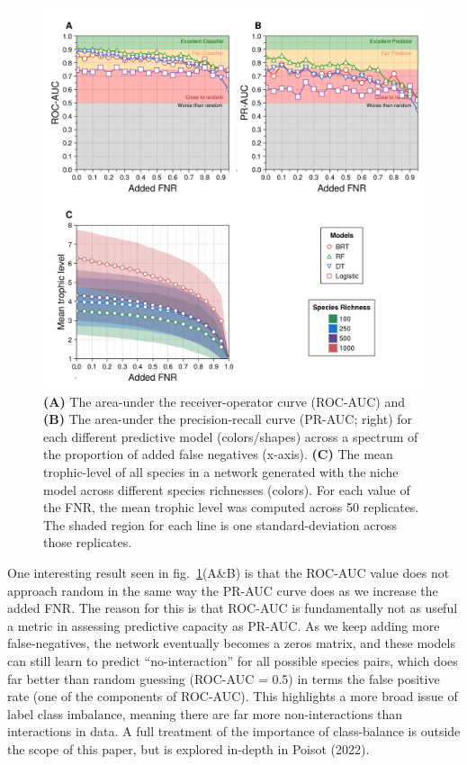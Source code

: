 \documentclass[11pt]{article}
\makeatletter
\def\maxwidth{\ifdim\Gin@nat@width>\linewidth\linewidth
\else\Gin@nat@width\fi}
\let\Oldincludegraphics\includegraphics
\renewcommand{\includegraphics}[1]{\Oldincludegraphics[width=\maxwidth]{#1}}
\makeatother
\begin{document}
\begin{figure}
\hypertarget{fig:addedfnr}{%
\centering
\includegraphics{./figures/fig3.png}
\caption{\textbf{(A)} The area-under the receiver-operator curve
(ROC-AUC) and \textbf{(B)} The area-under the precision-recall curve
(PR-AUC; right) for each different predictive model (colors/shapes)
across a spectrum of the proportion of added false negatives (x-axis).
\textbf{(C)} The mean trophic-level of all species in a network
generated with the niche model across different species richnesses
(colors). For each value of the FNR, the mean trophic level was computed
across 50 replicates. The shaded region for each line is one
standard-deviation across those replicates.}\label{fig:addedfnr}
}
\end{figure}

One interesting result seen in fig.~\ref{fig:addedfnr}(A\&B) is that the
ROC-AUC value does not approach random in the same way the PR-AUC curve
does as we increase the added FNR. The reason for this is that ROC-AUC
is fundamentally not as useful a metric in assessing predictive capacity
as PR-AUC. As we keep adding more false-negatives, the network
eventually becomes a zeros matrix, and these models can still learn to
predict ``no-interaction'' for all possible species pairs, which does
far better than random guessing (ROC-AUC = 0.5) in terms the false
positive rate (one of the components of ROC-AUC). This highlights a more
broad issue of label class imbalance, meaning there are far more
non-interactions than interactions in data. A full treatment of the
importance of class-balance is outside the scope of this paper, but is
explored in-depth in Poisot (2022).
\end{document}
